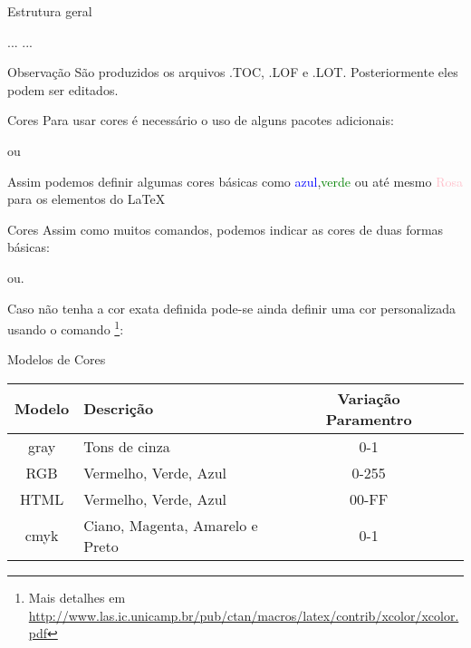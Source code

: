 \begin{frame}{Estrutura geral}
\begin{LaTeXcode}
\n
...\n
{}\n
{}\n
{}\n
{}\n
{}\n
{}\n
...\n
{}
\end{LaTeXcode}

\begin{block}{Observação}
São produzidos os arquivos .TOC, .LOF e .LOT. Posteriormente eles podem ser editados.
\end{block}
\end{frame}

\begin{frame}{Cores}
Para usar cores é necessário o uso de alguns pacotes adicionais:
\begin{LaTeXcode}
\n
ou\n
{}
\end{LaTeXcode}

Assim podemos definir algumas cores básicas como \textcolor{blue}{azul},\textcolor{green}{verde} ou até mesmo \textcolor{pink}{Rosa} para os elementos do \LaTeX

\end{frame}

\begin{frame}{Cores}
Assim como muitos comandos, podemos indicar as cores de duas formas básicas:

\begin{LaTeXcode}
\n ou\n {}.
\end{LaTeXcode}

Caso não tenha a cor exata definida pode-se ainda definir uma cor personalizada usando o comando \footnote{Mais detalhes em \url{http://www.las.ic.unicamp.br/pub/ctan/macros/latex/contrib/xcolor/xcolor.pdf}}:
\begin{LaTeXcode}
\end{LaTeXcode}
\end{frame}

\begin{frame}{Modelos de Cores}
\begin{block}{}
\begin{tabular}{cp{3cm}cl}
\textbf{Modelo} & \textbf{Descrição} & Variação Paramentro\\
\hline
gray & Tons de cinza & 0-1 \\
RGB & Vermelho, Verde, Azul & 0-255 \\
HTML & Vermelho, Verde, Azul & 00-FF \\
cmyk & Ciano, Magenta, Amarelo e Preto & 0-1 \\
\end{tabular}
\end{block}
\end{frame}

